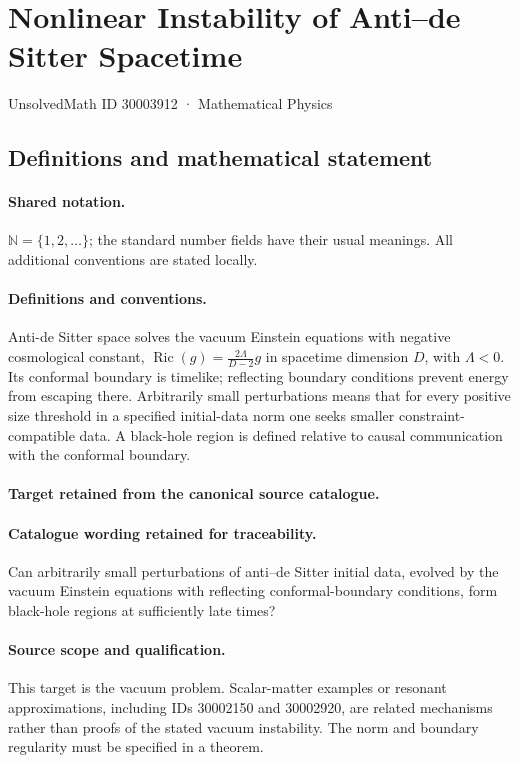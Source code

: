 \documentclass[11pt]{article}
\begin{document}
\setcounter{section}{30003911}
\section{Nonlinear Instability of Anti–de Sitter Spacetime}\label{30003912}
{\small UnsolvedMath ID 30003912 · Mathematical Physics}
\subsection{Definitions and mathematical statement}

\paragraph{Shared notation.}$\mathbb N=\{1,2,\ldots\}$; the standard number fields have their usual meanings. All additional conventions are stated locally.


\paragraph{Definitions and conventions.}
Anti-de Sitter space solves the vacuum Einstein equations with negative cosmological constant, $\operatorname{Ric}(g)=\frac{2\Lambda}{D-2}g$ in spacetime dimension $D$, with $\Lambda<0$. Its conformal boundary is timelike; reflecting boundary conditions prevent energy from escaping there. Arbitrarily small perturbations means that for every positive size threshold in a specified initial-data norm one seeks smaller constraint-compatible data. A black-hole region is defined relative to causal communication with the conformal boundary.

\paragraph{Target retained from the canonical source catalogue.}
\paragraph{Catalogue wording retained for traceability.}
Can arbitrarily small perturbations of anti–de Sitter initial data, evolved by the vacuum Einstein equations with reflecting conformal-boundary conditions, form black-hole regions at sufficiently late times?

\paragraph{Source scope and qualification.}
This target is the vacuum problem. Scalar-matter examples or resonant approximations, including IDs 30002150 and 30002920, are related mechanisms rather than proofs of the stated vacuum instability. The norm and boundary regularity must be specified in a theorem.
\end{document}
